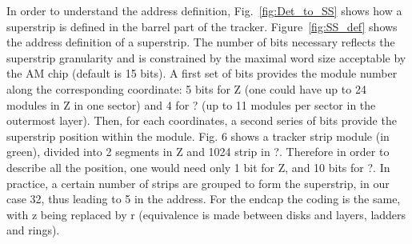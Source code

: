 \noindent In order to understand the address definition, Fig.~\ref{fig:Det_to_SS} shows how a superstrip is defined in the barrel part of the tracker. Figure~\ref{fig:SS_def} shows the address definition of a superstrip. The number of bits necessary reflects the superstrip granularity and is constrained by the maximal word size acceptable by the AM chip (default is 15 bits). A first set of bits provides the module number along the corresponding coordinate: 5 bits for Z (one could have up to 24 modules in Z in one sector) and 4 for ? (up to 11 modules per sector in the outermost layer). Then, for each coordinates, a second series of bits provide the superstrip position within the module. Fig. 6 shows a tracker strip module (in green), divided into 2 segments in Z and 1024 strip in ?. Therefore in order to describe all the position, one would need only 1 bit for Z, and 10 bits for ?. In practice, a certain number of strips are grouped to form the superstrip, in our case 32, thus leading to 5 in the address. For the endcap the coding is the same, with z being replaced by r (equivalence is made between disks and layers, ladders and rings). 



\clearpage
